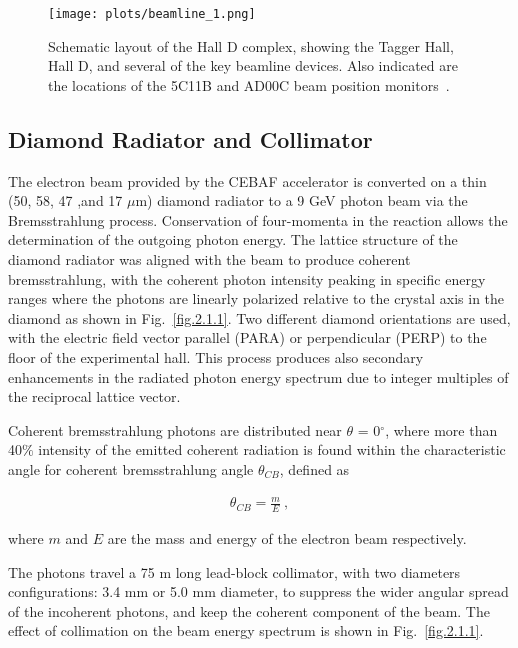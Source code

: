 {\begin{figure}[H]
    \centering
        \texttt{[image: plots/beamline\_1.png]}
        \caption{Schematic layout of the Hall D complex, showing the Tagger Hall, Hall D, and several of the key beamline devices. Also indicated are the locations of the 5C11B and AD00C beam position monitors~\cite{Charles16}.}
        \label{fig.2.1}
\end{figure}

\subsection{Diamond Radiator and Collimator}
\label{p.2.1.1}

The electron beam provided by the CEBAF accelerator is converted on a thin (50, 58, 47 ,and 17 $\mu$m) diamond radiator to a 9 GeV photon beam via the Bremsstrahlung process. Conservation of four-momenta in the reaction allows the determination of the outgoing photon energy. The lattice structure of the diamond radiator was aligned with the beam to produce coherent bremsstrahlung, with the coherent photon intensity peaking in specific energy ranges where the photons are linearly polarized relative to the crystal axis in the diamond as shown in Fig.~\ref{fig.2.1.1}. Two different diamond orientations are used, with the electric field vector parallel (PARA) or perpendicular (PERP) to the floor of the experimental hall. This process produces also secondary enhancements in the radiated photon energy spectrum due to integer multiples of the reciprocal lattice vector.
~\par Coherent bremsstrahlung photons are distributed near $\theta$ = 0$^{\circ}$, where more than 40$\%$ intensity of the emitted coherent radiation is found within the characteristic angle for coherent bremsstrahlung angle $\theta_{CB}$, defined as

\begin{equation}
    \label{eq.2.1.1}
    \begin{aligned}
        \theta_{CB} = \frac{m}{E}~,
    \end{aligned}
\end{equation}

\noindent where $m$ and $E$ are the mass and energy of the electron beam respectively.
~\par The photons travel a 75 m long lead-block collimator, with two diameters configurations: 3.4 mm or 5.0 mm diameter, to suppress the wider angular spread of the incoherent photons, and keep the coherent component of the beam. The effect of collimation on the beam energy spectrum is shown in Fig.~\ref{fig.2.1.1}.

}
